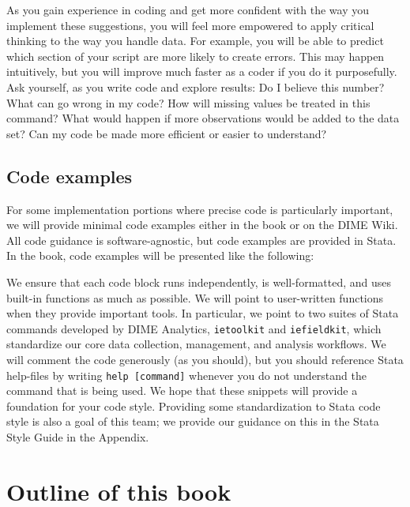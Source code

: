 As you gain experience in coding
and get more confident with the way you implement these suggestions,
you will feel more empowered to apply critical thinking to the way you handle data.
For example, you will be able to predict which section
of your script are more likely to create errors.
This may happen intuitively, but you will improve much faster as a coder
if you do it purposefully.
Ask yourself, as you write code and explore results:
Do I believe this number?
What can go wrong in my code?
How will missing values be treated in this command?
What would happen if more observations would be added to the data set?
Can my code be made more efficient or easier to understand?

\subsection{Code examples}
For some implementation portions where precise code is particularly important,
we will provide minimal code examples either in the book or on the DIME Wiki.
All code guidance is software-agnostic, but code examples are provided in Stata.
In the book, code examples will be presented like the following:


We ensure that each code block runs independently, is well-formatted,
and uses built-in functions as much as possible.
We will point to user-written functions when they provide important tools.
In particular, we point to two suites of Stata commands developed by DIME Analytics,
\texttt{ietoolkit} and
\texttt{iefieldkit},
which standardize our core data collection, management, and analysis workflows.
We will comment the code generously (as you should),
but you should reference Stata help-files by writing \texttt{help [command]}
whenever you do not understand the command that is being used.
We hope that these snippets will provide a foundation for your code style.
Providing some standardization to Stata code style is also a goal of this team;
we provide our guidance on this in the Stata Style Guide in the Appendix.

\section{Outline of this book}


